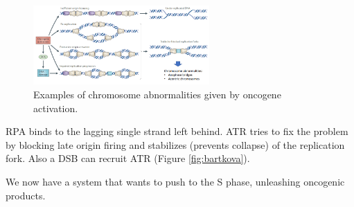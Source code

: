 \begin{figure}[H]
\centering
\includegraphics[width=0.6\textwidth]{../_resources/212276fa882f51c9df6ee225d31e5bae.png} 
\caption{Examples of chromosome abnormalities given by oncogene activation.}
\label{fig:aber}
\end{figure}

RPA binds to the lagging single strand left behind. 
ATR tries to fix the problem by blocking late origin firing and stabilizes (prevents collapse) of the replication fork. Also a DSB can recruit ATR (Figure \ref{fig:bartkova}).

We now have a system that wants to push to the S phase, unleashing oncogenic
products.


